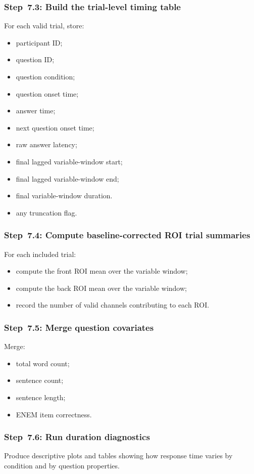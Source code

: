 \subsubsection{Step~7.3: Build the trial-level timing table}
For each valid trial, store:
\begin{itemize}
    \item participant ID;
    \item question ID;
    \item question condition;
    \item question onset time;
    \item answer time;
    \item next question onset time;
    \item raw answer latency;
    \item final lagged variable-window start;
    \item final lagged variable-window end;
    \item final variable-window duration.
    \item any truncation flag.
\end{itemize}

\subsubsection{Step~7.4: Compute baseline-corrected ROI trial summaries}
For each included trial:
\begin{itemize}
    \item compute the front ROI mean over the variable window;
    \item compute the back ROI mean over the variable window;
    \item record the number of valid channels contributing to each ROI.
\end{itemize}

\subsubsection{Step~7.5: Merge question covariates}
Merge:
\begin{itemize}
    \item total word count;
    \item sentence count;
    \item sentence length;
    \item ENEM item correctness.
\end{itemize}

\subsubsection{Step~7.6: Run duration diagnostics}
Produce descriptive plots and tables showing how response time varies by condition and by question properties.

